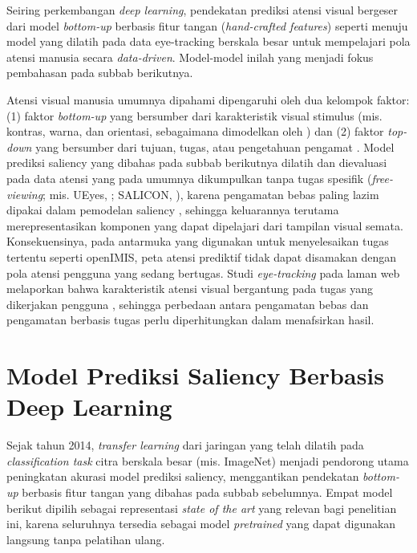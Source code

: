Seiring perkembangan \textit{deep learning}, pendekatan prediksi atensi visual bergeser dari model \textit{bottom-up} berbasis fitur tangan (\textit{hand-crafted features}) seperti \citet{itti1998model} menuju model yang dilatih pada data eye-tracking berskala besar untuk mempelajari pola atensi manusia secara \textit{data-driven}. Model-model inilah yang menjadi fokus pembahasan pada subbab berikutnya.

Atensi visual manusia umumnya dipahami dipengaruhi oleh dua kelompok faktor: (1) faktor \textit{bottom-up} yang bersumber dari karakteristik visual stimulus (mis. kontras, warna, dan orientasi, sebagaimana dimodelkan oleh \citealp{itti1998model}) dan (2) faktor \textit{top-down} yang bersumber dari tujuan, tugas, atau pengetahuan pengamat \citep{itti2001computational}. Model prediksi saliency yang dibahas pada subbab berikutnya dilatih dan dievaluasi pada data atensi yang pada umumnya dikumpulkan tanpa tugas spesifik (\textit{free-viewing}; mis. UEyes, \citealp{jiang2023ueyes}; SALICON, \citealp{jiang2015salicon}), karena pengamatan bebas paling lazim dipakai dalam pemodelan saliency \citep{bylinskii2019what}, sehingga keluarannya terutama merepresentasikan komponen yang dapat dipelajari dari tampilan visual semata. Konsekuensinya, pada antarmuka yang digunakan untuk menyelesaikan tugas tertentu seperti openIMIS, peta atensi prediktif tidak dapat disamakan dengan pola atensi pengguna yang sedang bertugas. Studi \textit{eye-tracking} pada laman web melaporkan bahwa karakteristik atensi visual bergantung pada tugas yang dikerjakan pengguna \citet{buscher2009what}, sehingga perbedaan antara pengamatan bebas dan pengamatan berbasis tugas perlu diperhitungkan dalam menafsirkan hasil.


\section{Model Prediksi Saliency Berbasis Deep Learning}

Sejak tahun 2014, \textit{transfer learning} dari jaringan yang telah dilatih pada \textit{classification task} citra berskala besar (mis. ImageNet) menjadi pendorong utama peningkatan akurasi model prediksi saliency, menggantikan pendekatan \textit{bottom-up} berbasis fitur tangan yang dibahas pada subbab sebelumnya. Empat model berikut dipilih sebagai representasi \textit{state of the art} yang relevan bagi penelitian ini, karena seluruhnya tersedia sebagai model \textit{pretrained} yang dapat digunakan langsung tanpa pelatihan ulang. 
 
